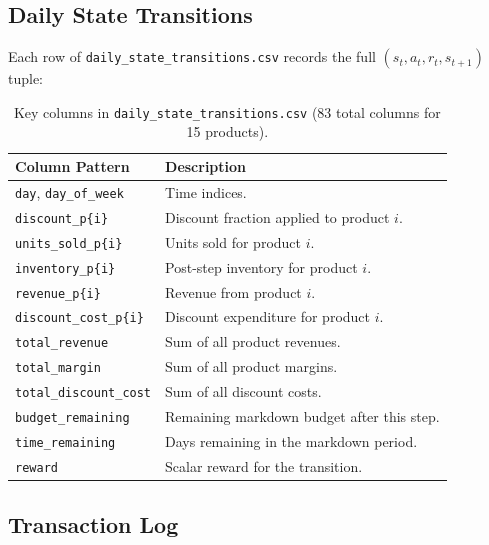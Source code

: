 \documentclass[11pt,a4paper]{article}
\begin{document}
\subsection{Daily State Transitions}

Each row of \texttt{daily\_state\_transitions.csv} records the full $(s_t, a_t, r_t, s_{t+1})$ tuple:

\begin{table}[H]
\centering
\caption{Key columns in \texttt{daily\_state\_transitions.csv} (83 total columns for 15 products).}
\begin{tabular}{@{}lp{8.5cm}@{}}
\toprule
\textbf{Column Pattern} & \textbf{Description} \\
\midrule
\texttt{day}, \texttt{day\_of\_week} & Time indices. \\
\texttt{discount\_p\{i\}} & Discount fraction applied to product $i$. \\
\texttt{units\_sold\_p\{i\}} & Units sold for product $i$. \\
\texttt{inventory\_p\{i\}} & Post-step inventory for product $i$. \\
\texttt{revenue\_p\{i\}} & Revenue from product $i$. \\
\texttt{discount\_cost\_p\{i\}} & Discount expenditure for product $i$. \\
\texttt{total\_revenue} & Sum of all product revenues. \\
\texttt{total\_margin} & Sum of all product margins. \\
\texttt{total\_discount\_cost} & Sum of all discount costs. \\
\texttt{budget\_remaining} & Remaining markdown budget after this step. \\
\texttt{time\_remaining} & Days remaining in the markdown period. \\
\texttt{reward} & Scalar reward for the transition. \\
\bottomrule
\end{tabular}
\end{table}

\subsection{Transaction Log}
\end{document}

